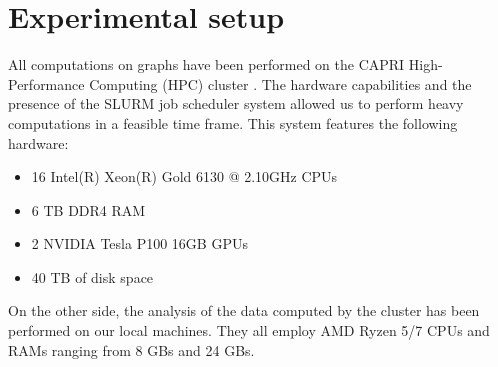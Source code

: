 \section{Experimental setup}

All computations on graphs have been performed on the CAPRI High-Performance Computing (HPC) cluster \cite{capri}. The hardware capabilities and the presence of the SLURM job scheduler system allowed us to perform heavy computations in a feasible time frame. This system features the following hardware:
\begin{itemize}
    \item 16 Intel(R) Xeon(R) Gold 6130 @ 2.10GHz CPUs
    \item 6 TB DDR4 RAM
    \item 2 NVIDIA Tesla P100 16GB GPUs
    \item 40 TB of disk space
\end{itemize}

On the other side, the analysis of the data computed by the cluster has been performed on our local machines. They all employ AMD Ryzen 5/7 CPUs and RAMs ranging from 8 GBs and 24 GBs.